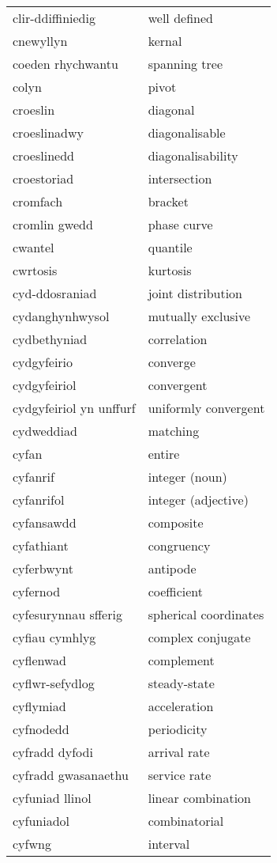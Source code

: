 \begin{supertabular}{p{0.22\textwidth}p{0.22\textwidth}}
clir-ddiffiniedig & well defined \\
cnewyllyn & kernal \\
coeden rhychwantu & spanning tree \\
colyn & pivot \\
croeslin & diagonal \\
croeslinadwy & diagonalisable \\
croeslinedd & diagonalisability \\
croestoriad & intersection \\
cromfach & bracket \\
cromlin gwedd & phase curve \\
cwantel & quantile \\
cwrtosis & kurtosis \\
cyd-ddosraniad & joint distribution \\
cydanghynhwysol & mutually exclusive \\
cydbethyniad & correlation \\
cydgyfeirio & converge \\
cydgyfeiriol & convergent \\
cydgyfeiriol yn unffurf & uniformly convergent \\
cydweddiad & matching \\
cyfan & entire \\
cyfanrif & integer (noun) \\
cyfanrifol & integer (adjective) \\
cyfansawdd & composite \\
cyfathiant & congruency \\
cyferbwynt & antipode \\
cyfernod & coefficient \\
cyfesurynnau sfferig & spherical coordinates \\
cyfiau cymhlyg & complex conjugate \\
cyflenwad & complement \\
cyflwr-sefydlog & steady-state \\
cyflymiad & acceleration \\
cyfnodedd & periodicity \\
cyfradd dyfodi & arrival rate \\
cyfradd gwasanaethu & service rate \\
cyfuniad llinol & linear combination \\
cyfuniadol & combinatorial \\
cyfwng & interval \\

\end{supertabular}
